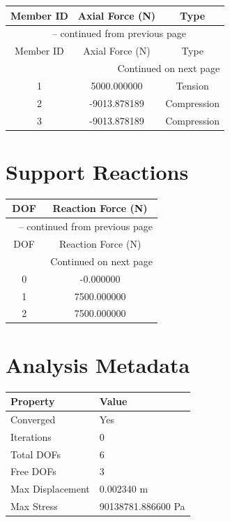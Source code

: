 \documentclass[11pt,a4paper]{article}
\begin{document}
\begin{longtable}{ccc}
\toprule
Member ID & Axial Force (N) & Type \\
\midrule
\endfirsthead

\multicolumn{3}{c}{{\tablename\ \thetable{} -- continued from previous page}} \\
\toprule
Member ID & Axial Force (N) & Type \\
\midrule
\endhead

\midrule
\multicolumn{3}{r}{{Continued on next page}} \\
\endfoot

\bottomrule
\endlastfoot

1 & 5000.000000 & Tension \\
2 & -9013.878189 & Compression \\
3 & -9013.878189 & Compression \\
\end{longtable}

\section{Support Reactions}

\begin{longtable}{cc}
\toprule
DOF & Reaction Force (N) \\
\midrule
\endfirsthead

\multicolumn{2}{c}{{\tablename\ \thetable{} -- continued from previous page}} \\
\toprule
DOF & Reaction Force (N) \\
\midrule
\endhead

\midrule
\multicolumn{2}{r}{{Continued on next page}} \\
\endfoot

\bottomrule
\endlastfoot

0 & -0.000000 \\
1 & 7500.000000 \\
2 & 7500.000000 \\
\end{longtable}

\section{Analysis Metadata}

\begin{tabular}{ll}
\toprule
Property & Value \\
\midrule
Converged & Yes \\
Iterations & 0 \\
Total DOFs & 6 \\
Free DOFs & 3 \\
Max Displacement & 0.002340 m \\
Max Stress & 90138781.886600 Pa \\
\bottomrule
\end{tabular}
\end{document}
